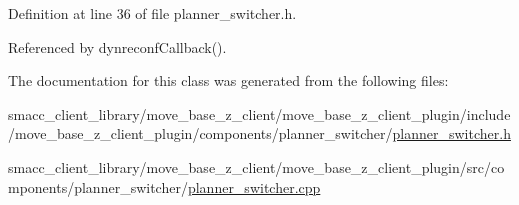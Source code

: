 Definition at line 36 of file planner\+\_\+switcher.\+h.



Referenced by dynreconf\+Callback().



The documentation for this class was generated from the following files\+:\begin{DoxyCompactItemize}
\item 
smacc\+\_\+client\+\_\+library/move\+\_\+base\+\_\+z\+\_\+client/move\+\_\+base\+\_\+z\+\_\+client\+\_\+plugin/include/move\+\_\+base\+\_\+z\+\_\+client\+\_\+plugin/components/planner\+\_\+switcher/\hyperlink{planner__switcher_8h}{planner\+\_\+switcher.\+h}\item 
smacc\+\_\+client\+\_\+library/move\+\_\+base\+\_\+z\+\_\+client/move\+\_\+base\+\_\+z\+\_\+client\+\_\+plugin/src/components/planner\+\_\+switcher/\hyperlink{planner__switcher_8cpp}{planner\+\_\+switcher.\+cpp}\end{DoxyCompactItemize}
